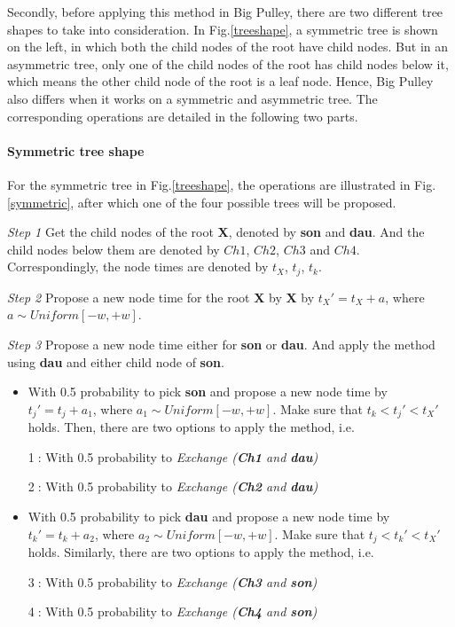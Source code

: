 \documentclass{bmcart}
\begin{document}
Secondly, before applying this method in Big Pulley, there are two different tree shapes to take into consideration. In Fig.\ref{treeshape}, a symmetric tree is shown on the left, in which both the child nodes of the root have child nodes. But in an asymmetric tree, only one of the child nodes of the root has child nodes below it, which means the other child node of the root is a leaf node. Hence, Big Pulley also differs when it works on a symmetric and asymmetric tree. The corresponding operations are detailed in the following two parts.
\paragraph*{Symmetric tree shape}

For the symmetric tree in Fig.\ref{treeshape}, the operations are illustrated in Fig.\ref{symmetric}, after which one of the four possible trees will be proposed.

\emph{Step 1} Get the child nodes of the root \textbf{X}, denoted by \textbf{son} and \textbf{dau}. And the child nodes below them are denoted by $Ch1$, $Ch2$, $Ch3$ and $Ch4$. Correspondingly, the node times are denoted by $t_X$, $t_j$, $t_k$.

\emph{Step 2} Propose a new node time for the root \textbf{X} by \textbf{X} by ${t_X}' = {t_X} + a$, where $a \sim Uniform[ - w, + w]$. 

\emph{Step 3} Propose a new node time either for \textbf{son} or \textbf{dau}. And apply the method using \textbf{dau} and either child node of \textbf{son}. 
\begin{itemize}
\item With 0.5 probability to pick \textbf{son} and propose a new node time by ${t_j}' = {t_j} + {a_1}$, where ${a_1} \sim Uniform[ - w, + w]$. Make sure that ${t_k} < {t_j}' < {t_X}'$ holds. Then, there are two options to apply the method, i.e.

\textcircled1: With 0.5 probability to \textit{Exchange (\textbf{Ch1} and \textbf{dau})}

\textcircled2: With 0.5 probability to \textit{Exchange (\textbf{Ch2} and \textbf{dau})}

\item With 0.5 probability to pick \textbf{dau} and propose a new node time by ${t_k}' = {t_k} + {a_2}$, where ${a_2} \sim Uniform[ - w, + w]$. Make sure that ${t_j} < {t_k}' < {t_X}'$ holds. Similarly, there are two options to apply the method, i.e.

\textcircled3: With 0.5 probability to \textit{Exchange (\textbf{Ch3} and \textbf{son})}

\textcircled4: With 0.5 probability to \textit{Exchange (\textbf{Ch4} and \textbf{son})}
\end{itemize}
\end{document}
